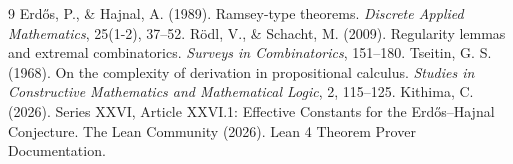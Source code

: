 \documentclass[11pt,a4paper]{article}
\begin{document}

\begin{thebibliography}{9}
  Erdős, P., \& Hajnal, A. (1989). Ramsey-type theorems. \emph{Discrete Applied Mathematics}, 25(1-2), 37–52.
  Rödl, V., \& Schacht, M. (2009). Regularity lemmas and extremal combinatorics. \emph{Surveys in Combinatorics}, 151–180.
  Tseitin, G. S. (1968). On the complexity of derivation in propositional calculus. \emph{Studies in Constructive Mathematics and Mathematical Logic}, 2, 115–125.
  Kithima, C. (2026). Series XXVI, Article XXVI.1: Effective Constants for the Erdős–Hajnal Conjecture.
  The Lean Community (2026). Lean 4 Theorem Prover Documentation.
\end{thebibliography}
\end{document}
